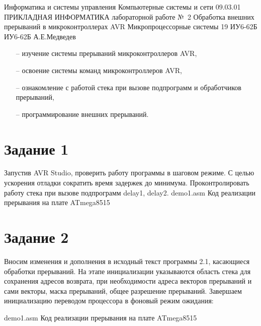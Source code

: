 \documentclass{bmstu}
\makeatletter
\renewcommand\chapter{\par%
\thispagestyle{plain}%
\@afterindentfalse \secdef\@chapter\@schapter}
\makeatother
\begin{document}
\makereporttitle
    {Информатика и системы управления} %
    {Компьютерные системы и сети} %
    {09.03.01 ПРИКЛАДНАЯ ИНФОРМАТИКА} %
    {лабораторной работе №~2} %
    {Обработка внешних прерываний в микроконтроллерах AVR} %
    {Микропроцессорные системы} %
    {19} %
    {ИУ6-62Б} %
    {
    	{ИУ6-62Б}
    	{А.Е.Медведев} %
    	{} %
    } 
    
\chapter{Цель работы:}
\begin{itemize}
\item[--] изучение системы прерываний микроконтроллеров AVR,
\item[--] освоение системы команд микроконтроллеров AVR,
\item[--] ознакомление с работой стека при вызове подпрограмм и обработчиков прерываний,
\item[--] программирование внешних прерываний.  
\end{itemize}

\chapter{Задания:}
\section{Задание 1}
Запустив AVR Studio, проверить работу программы в шаговом режиме. С целью ускорения отладки сократить время задержек до минимума. Проконтролировать работу стека при вызове подпрограмм delay1, delay2.
	{demo1.asm}
	{Код реализации прерывания на плате ATmega8515}

\section{Задание 2}
Вносим изменения  и дополнения в исходный текст программы 2.1, касающиеся обработки прерываний. На этапе инициализации указываются область стека для сохранения адресов возврата, при необходимости адреса векторов прерываний и сами векторы, маска прерываний, общее разрешение прерываний. Завершаем инициализацию переводом процессора в фоновый режим ожидания:

	{demo1.asm}
	{Код реализации прерывания на плате ATmega8515}
\end{document}
